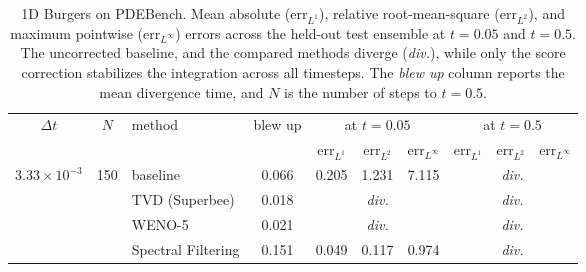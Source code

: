 \documentclass[letterpaper]{article} %
\begin{document}
\begin{table}[t]
    \centering
    \footnotesize
    \caption{1D Burgers on PDEBench. Mean absolute ($\mathrm{err}_{L^1}$), relative root-mean-square ($\mathrm{err}_{L^2}$), and maximum pointwise ($\mathrm{err}_{L^\infty}$) errors across the held-out test ensemble at $t=0.05$ and $t=0.5$. The uncorrected baseline, and the compared methods diverge (\textit{div.}), while only the score correction stabilizes the integration across all timesteps. The \emph{blew up} column reports the mean divergence time, and $N$ is the number of steps to $t=0.5$.}

    \label{tab:burgers_stability}
    \setlength{\tabcolsep}{4pt}
    \begin{tabular}{c c l | c | c c c | c c c}
        \hline

\multirow{2}{*}{$\Delta t$} & \multirow{2}{*}{$N$} & \multirow{2}{*}{method} & \multirow{2}{*}{blew up} & \multicolumn{3}{c|}{at $t = 0.05$} & \multicolumn{3}{c}{at $t = 0.5$} \\
\cline{5-7}\cline{8-10}
 & & & & $\mathrm{err}_{L^1}$ & $\mathrm{err}_{L^2}$ & $\mathrm{err}_{L^\infty}$ & $\mathrm{err}_{L^1}$ & $\mathrm{err}_{L^2}$ & $\mathrm{err}_{L^\infty}$ \\
 \hline
\multirow{5}{*}{$3.33\!\times\!10^{-3}$} & \multirow{5}{*}{150}
 & baseline & 0.066 & 0.205 & 1.231 & 7.115 & \multicolumn{3}{c}{\textit{div.}} \\
 & & TVD (Superbee) & 0.018 & \multicolumn{3}{c|}{\textit{div.}} & \multicolumn{3}{c}{\textit{div.}} \\
 & & WENO-5 & 0.021 & \multicolumn{3}{c|}{\textit{div.}} & \multicolumn{3}{c}{\textit{div.}} \\
 & & Spectral Filtering & 0.151 & 0.049 & 0.117 & 0.974 & \multicolumn{3}{c}{\textit{div.}} \\

\end{tabular}
\end{table}
\end{document}

